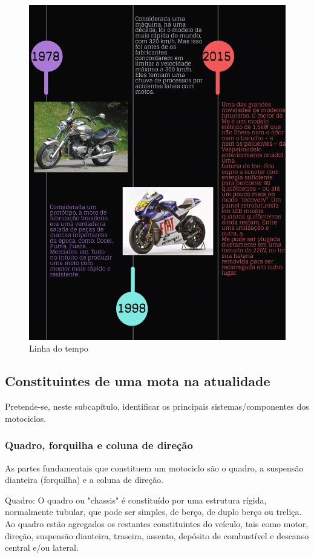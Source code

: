 \documentclass{report}
\begin{document}
\begin{figure}[h]
\center
\includegraphics[scale=0.5]{linha do tempo2.jpeg} 
\caption{Linha do tempo }
\label{figura:Linha do tempo}
\end{figure}

\clearpage
\subsection{Constituintes de uma mota na atualidade}
Pretende-se, neste subcapítulo, identificar os principais sistemas/componentes dos motociclos.
\subsubsection{Quadro, forquilha e coluna de direção}
As partes fundamentais que constituem um motociclo  são o quadro, a suspensão dianteira (forquilha) e a coluna  de direção.

Quadro: O quadro ou "chassis" é constituído por uma estrutura rígida, normalmente tubular, que pode ser simples, de berço, de duplo  berço ou treliça. Ao quadro estão agregados os restantes constituintes  do veículo, tais como  motor, direção, suspensão dianteira, traseira, assento, depósito de combustível  e descanso  central e/ou lateral.
\end{document}
